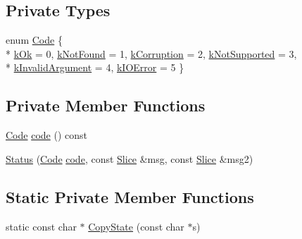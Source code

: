 \subsection*{Private Types}
\begin{DoxyCompactItemize}
\item 
enum \hyperlink{classleveldb_1_1_status_a86ca3f4adce279a55ac09d2b1595f79e}{Code} \{ \\*
\hyperlink{classleveldb_1_1_status_a86ca3f4adce279a55ac09d2b1595f79ea4c54273a0fbd51290eae80d9cc80117a}{k\-Ok} = 0, 
\hyperlink{classleveldb_1_1_status_a86ca3f4adce279a55ac09d2b1595f79ea87edd90692a671b10c26be30e9b72fa1}{k\-Not\-Found} = 1, 
\hyperlink{classleveldb_1_1_status_a86ca3f4adce279a55ac09d2b1595f79eadaf0012d73a1227ac1becd24f9fe2bde}{k\-Corruption} = 2, 
\hyperlink{classleveldb_1_1_status_a86ca3f4adce279a55ac09d2b1595f79ea4e89a938069aed11621b189d48794ccc}{k\-Not\-Supported} = 3, 
\\*
\hyperlink{classleveldb_1_1_status_a86ca3f4adce279a55ac09d2b1595f79ea6f372f89cd74535fc2c3656d7d491d79}{k\-Invalid\-Argument} = 4, 
\hyperlink{classleveldb_1_1_status_a86ca3f4adce279a55ac09d2b1595f79eaaf6bab40c7a93f4f947177f605f0a1ba}{k\-I\-O\-Error} = 5
 \}
\end{DoxyCompactItemize}
\subsection*{Private Member Functions}
\begin{DoxyCompactItemize}
\item 
\hyperlink{classleveldb_1_1_status_a86ca3f4adce279a55ac09d2b1595f79e}{Code} \hyperlink{classleveldb_1_1_status_a7e1c5239636c9e0ffff6df6144f32af3}{code} () const 
\item 
\hyperlink{classleveldb_1_1_status_a84bf55896b6ed85828c75ce0ceffc19e}{Status} (\hyperlink{classleveldb_1_1_status_a86ca3f4adce279a55ac09d2b1595f79e}{Code} \hyperlink{classleveldb_1_1_status_a7e1c5239636c9e0ffff6df6144f32af3}{code}, const \hyperlink{classleveldb_1_1_slice}{Slice} \&msg, const \hyperlink{classleveldb_1_1_slice}{Slice} \&msg2)
\end{DoxyCompactItemize}
\subsection*{Static Private Member Functions}
\begin{DoxyCompactItemize}
\item 
static const char $\ast$ \hyperlink{classleveldb_1_1_status_a8ba9034a426f8bfaf7f9f94fcf534a3a}{Copy\-State} (const char $\ast$s)
\end{DoxyCompactItemize}

